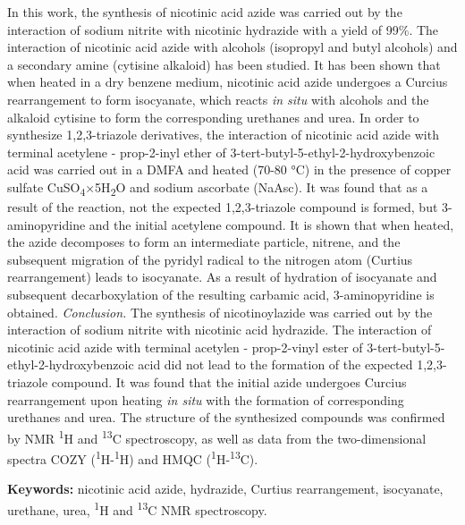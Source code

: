 In this work, the synthesis of nicotinic acid azide was carried out by
the interaction of sodium nitrite with nicotinic hydrazide with a yield
of 99\%. The interaction of nicotinic acid azide with alcohols
(isopropyl and butyl alcohols) and a secondary amine (cytisine alkaloid)
has been studied. It has been shown that when heated in a dry benzene
medium, nicotinic acid azide undergoes a Curcius rearrangement to form
isocyanate, which reacts \emph{in situ} with alcohols and the alkaloid
cytisine to form the corresponding urethanes and urea. In order to
synthesize 1,2,3-triazole derivatives, the interaction of nicotinic acid
azide with terminal acetylene - prop-2-inyl ether of
3-tert-butyl-5-ethyl-2-hydroxybenzoic acid was carried out in a DMFA and
heated (70-80 °C) in the presence of copper sulfate
CuSO\textsubscript{4}×5H\textsubscript{2}O and sodium ascorbate (NaAsc).
It was found that as a result of the reaction, not the expected
1,2,3-triazole compound is formed, but 3-aminopyridine and the initial
acetylene compound. It is shown that when heated, the azide decomposes
to form an intermediate particle, nitrene, and the subsequent migration
of the pyridyl radical to the nitrogen atom (Curtius rearrangement)
leads to isocyanate. As a result of hydration of isocyanate and
subsequent decarboxylation of the resulting carbamic acid,
3-aminopyridine is obtained. \emph{Conclusion.} The synthesis of
nicotinoylazide was carried out by the interaction of sodium nitrite
with nicotinic acid hydrazide. The interaction of nicotinic acid azide
with terminal acetylen - prop-2-vinyl ester of
3-tert-butyl-5-ethyl-2-hydroxybenzoic acid did not lead to the formation
of the expected 1,2,3-triazole compound. It was found that the initial
azide undergoes Curcius rearrangement upon heating \emph{in situ} with
the formation of corresponding urethanes and urea. The structure of the
synthesized compounds was confirmed by NMR \textsuperscript{1}H and
\textsuperscript{13}C spectroscopy, as well as data from the
two-dimensional spectra COZY (\textsuperscript{1}H-\textsuperscript{1}H)
and HMQC (\textsuperscript{1}H-\textsuperscript{13}C).

{\bfseries Keywords:} nicotinic acid azide, hydrazide, Curtius
rearrangement, isocyanate, urethane, urea, \textsuperscript{1}H and
\textsuperscript{13}C NMR spectroscopy.

